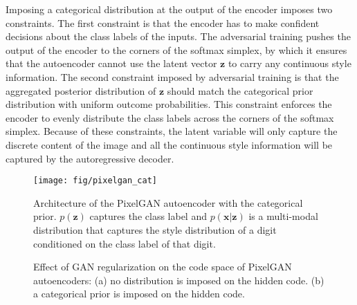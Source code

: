 \documentclass{article}
\begin{document}
Imposing a categorical distribution at the output of the encoder imposes two constraints. The first constraint is that the encoder has to make confident decisions about the class labels of the inputs. The adversarial training pushes the output of the encoder to the corners of the softmax simplex, by which it ensures that the autoencoder cannot use the latent vector $\mathbf{z}$ to carry any continuous style information. The second constraint imposed by adversarial training is that the aggregated posterior distribution of $\mathbf{z}$ should match the categorical prior distribution with uniform outcome probabilities. This constraint enforces the encoder to evenly distribute the class labels across the corners of the softmax simplex. Because of these constraints, the latent variable will only capture the discrete content of the image and all the continuous style information will be captured by the autoregressive decoder. 

\begin{figure}[t]
\begin{center}
\hspace{4cm}\texttt{[image: fig/pixelgan\_cat]}
\end{center}
\vspace{-.3cm}
\caption{\label{fig:pixelgan_cat}Architecture of the PixelGAN autoencoder with the categorical prior. $p(\mathbf{z})$ captures the class label and $p(\mathbf{x}|\mathbf{z})$ is a multi-modal distribution that captures the style distribution of a digit conditioned on the class label of that digit.}
\end{figure}

\begin{figure}[b]
\centering
{}
\hspace{1cm}
\vspace{-.3cm}
\caption{\label{fig:pixelgan_cluster_toy}{Effect of GAN regularization on the code space of PixelGAN autoencoders: (a) no distribution is imposed on the hidden code. (b) a categorical prior is imposed on the hidden code.}}
\end{figure}
\end{document}
